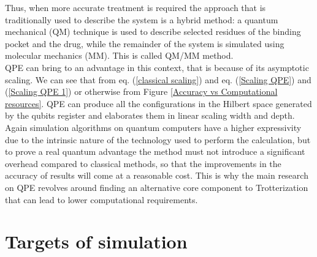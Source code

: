Thus, when more accurate treatment is required the approach that is traditionally used to describe the system is a hybrid method: a quantum mechanical (QM) technique is used to describe selected residues of the binding pocket and the drug, while the remainder of the system is simulated using molecular mechanics (MM). This is called QM/MM method. \\
QPE can bring to an advantage in this context, that is because of its asymptotic scaling. We can see that from eq. (\ref{classical scaling}) and eq. (\ref{Scaling QPE}) and (\ref{Scaling QPE 1}) or otherwise from Figure \ref{Accuracy vs Computational resources}. QPE can produce all the configurations in the Hilbert space generated by the qubits register and elaborates them in linear scaling width and depth. \\
Again simulation algorithms on quantum computers have a higher expressivity due to the intrinsic nature of the technology used to perform the calculation, but to prove a real quantum advantage the method must not introduce a significant overhead compared to classical methods, so that the improvements in the accuracy of results will come at a reasonable cost. This is why the main research on QPE revolves around finding an alternative core component to Trotterization that can lead to lower computational requirements.

\section{Targets of simulation}

